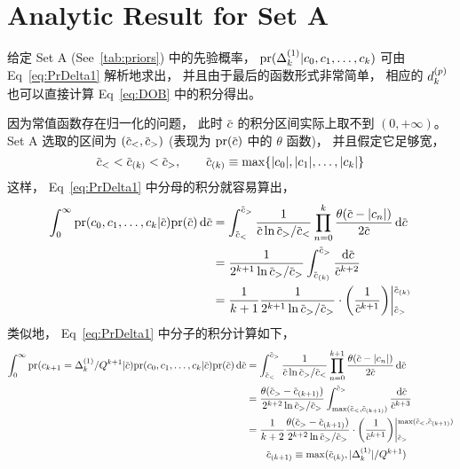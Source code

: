 
\section{Analytic Result for Set A}
给定 Set A (See~\ref{tab:priors}) 中的先验概率，
$\textrm{pr}(\Delta_k^{(1)}|c_0,c_1,\ldots,c_k)$ 可由 Eq~\eqref{eq:PrDelta1} 解析地求出，
并且由于最后的函数形式非常简单，
相应的 $d_k^{(p)}$ 也可以直接计算 Eq~\eqref{eq:DOB} 中的积分得出。

因为常值函数存在归一化的问题，
此时 $\dmscbar$ 的积分区间实际上取不到 $(0,+\infty)$。
Set A 选取的区间为 $(\dmscbar_<,\dmscbar_>)$
(表现为 $\dmspr(\dmscbar)$ 中的 $\theta$ 函数)，
并且假定它足够宽，
\begin{equation}
  \label{eq:4-1}
  \dmscbar_< < \dmscbar_{(k)} < \dmscbar_>,\qquad
  \dmscbar_{(k)}\equiv\max\{|c_0|,|c_1|,\ldots,|c_k|\}
\end{equation}
这样，
Eq~\eqref{eq:PrDelta1} 中分母的积分就容易算出，
\begin{equation}
  \label{eq:4-2}
  \begin{aligned}
    \int_0^\infty\dmspr(\dmsccck|\dmscbar)\dmspr(\dmscbar)\dmsdif\dmscbar
    &=  \int_{\dmscbar_<}^{\dmscbar_>} \frac{1}{\dmscbar\ln\dmscbar_>/\dmscbar_<}
    \prod_{n=0}^{k} \frac{\theta(\dmscbar-|c_n|)}{2\dmscbar}\dmsdif\dmscbar\\
    &=  \frac{1}{2^{k+1}\ln\dmscbar_>/\dmscbar_>}\int_{\dmscbar_{(k)}}^{\dmscbar_>}
    \frac{\dmsdif\dmscbar}{\dmscbar^{k+2}} \\
    &= \frac{1}{k+1} \frac{1}{2^{k+1}\ln\dmscbar_>/\dmscbar_>}\cdot\biggl(
    \frac{1}{\dmscbar^{k+1}}\biggr)\dmsvat[\bigg]{\dmscbar_>}{\dmscbar_{(k)}}
  \end{aligned}
\end{equation}
类似地，
Eq~\eqref{eq:PrDelta1} 中分子的积分计算如下，
\begin{equation}
  \label{eq:4-3}
  \begin{aligned}
    \int_0^\infty\dmspr(c_{k+1}=\dmsdeltako/Q^{k+1}|\dmscbar)
    \dmspr(\dmsccck|\dmscbar)\dmspr(\dmscbar)\dmsdif\dmscbar
    &= \int_{\dmscbar_<}^{\dmscbar_>} \frac{1}{\dmscbar\ln\dmscbar_>/\dmscbar_<}
    \prod_{n=0}^{k+1}\frac{\theta(\dmscbar-|c_n|)}{2\dmscbar}\dmsdif\dmscbar\\
    &= \frac{\theta(\dmscbar_>-\dmscbar_{(k+1)})}{2^{k+2}
      \ln\dmscbar_>/\dmscbar_>}\int^{\dmscbar_>}_{\max(\dmscbar_<,\dmscbar_{(k+1)})}
    \frac{\dmsdif\dmscbar}{\dmscbar^{k+3}} \\
    &= \frac{1}{k+2} \frac{\theta(\dmscbar_>-\dmscbar_{(k+1)})
    }{2^{k+2}\ln\dmscbar_>/\dmscbar_>}\cdot\biggl(
    \frac{1}{\dmscbar^{k+1}}\biggr)\dmsvat[\bigg]{\dmscbar_>}{
      \max(\dmscbar_<,\dmscbar_{(k+1)})}\\
    &\qquad\dmscbar_{(k+1)}\equiv\max(\dmscbar_{(k)},|\dmsdeltako|/Q^{k+1})
  \end{aligned}
\end{equation}

